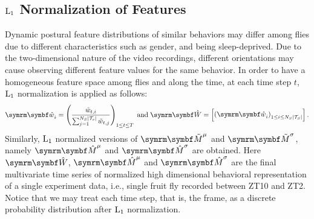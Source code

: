 \subsection{\texorpdfstring{$\textnormal{L}_1$}{L1} Normalization of Features}\label{section:feature-normalization}
Dynamic postural feature distributions of similar behaviors may differ among flies due to different characteristics such as gender, and being sleep-deprived.
Due to the two-dimensional nature of the video recordings, different orientations may cause observing different feature values for the same behavior.
In order to have a homogeneous feature space among flies and along the time, at each time step $t$, $\textnormal{L}_1$ normalization is applied as follows:
\begin{equation}
	\V{\hat{w}}_i = \rbr{\frac{\tilde{w}_{t,i}}{\sum_{j=1}^{N_S \card*{\mathcal{T}_s}}\tilde{w}_{t, j}}}_{1 \leq t \leq T} \dband \V{\hat{W}}   = \qmatrix{\rbr{\V{\hat{w}}_i}_{1 \leq i \leq N_S\card*{\mathcal{T}_S}}}.
\end{equation}
Similarly, $\textnormal{L}_1$ normalized versions of ${\V{\tilde{M}}^\mu}$ and ${\V{\tilde{M}}^\sigma}$, namely $\V{\hat{M}}^\mu$ and $\V{\hat{M}}^\sigma$ are obtained.
Here $\V{\hat{W}}$, $\V{\hat{M}}^\mu$ and $\V{\hat{M}}^\sigma$ are the final multivariate time series of normalized high dimensional behavioral representation of a single experiment data, i.e., single fruit fly recorded between ZT10 and ZT2.
Notice that we may treat each time step, that is, the frame, as a discrete probability distribution after $\textnormal{L}_1$ normalization.
